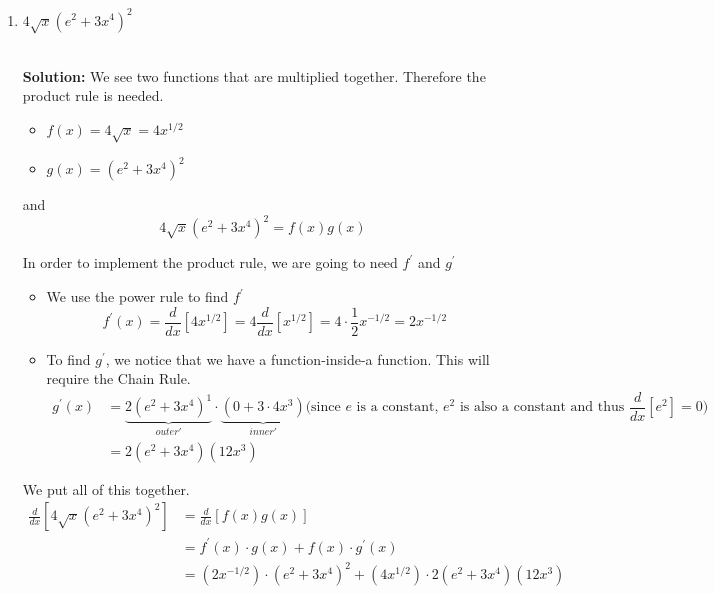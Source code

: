 \documentclass[11pt]{article}
\newcommand{\col}[1]{{\color{blue}#1}} %
\newcommand{\solbf}[1]{~\\ \col{ {\textbf{Solution: }}#1} }
\newcommand{\al}[1]{\begin{align*} #1 \end{align*}}
\newcommand{\itemI}[1]{\begin{itemize} #1 \end{itemize}}
\def\ds{\displaystyle}
\begin{document}
\begin{enumerate}
\begin{enumerate}
{$f(x)=\dfrac{\ln(x)+x^2}{x^3-2x}$.
We see two functions that are divided. Therefore the quotient rule is needed.
\itemI{
\item  $\ds hi(x)=\ln(x)+x^2 \Rightarrow  hi^{\prime}(x)=\frac{1}{x}+2x$ 
\item  $lo(x)=x^3-2x \Rightarrow lo^{\prime}(x)=3x^2-2$
}

\al{
\frac{d}{dx}\left[ \dfrac{\ln(x)+x^2}{x^3-2x} \right]&=\frac{hi^{\prime}(x)\cdot lo(x)-hi(x)\cdot lo^{\prime}(x)}{lo^2(x)}\\
&=\frac{\left(\dfrac{1}{x}+2x \right)\left(x^3-2x \right)-\left(\ln(x)+x^2 \right) \left(3x^2-2 \right)}{\left(x^3-2x \right)^2}
}
}

\item $4\sqrt{x}\left(e^2+3x^4\right)^2$\\
\solbf{We see two functions that are multiplied together. Therefore the product rule is needed.
\itemI{
\item $f(x)=4\sqrt{x}=4x^{1/2}$
\item $g(x)=(e^2+3x^4)^2$
}
and $$4\sqrt{x}\left(e^2+3x^4\right)^2=f(x)g(x)$$

In order to implement the product rule, we are going to need $f^{\prime}$ and $g^{\prime}$
\itemI{
\item We use the power rule to find $f^{\prime}$
$$\ds f^{\prime}(x)=\frac{d}{dx}\left[4x^{1/2}\right]=4\frac{d}{dx}\left[x^{1/2}\right]=4\cdot \frac{1}{2}x^{-1/2} =2x^{-1/2} $$
\item To find $g^{\prime}$, we notice that we have a function-inside-a function. This will require the Chain Rule.
\al{
g^{\prime}(x)&=\underbrace{2\left( e^2+3x^4\right)^1}_{outer'}\cdot \underbrace{\left( 0+3\cdot 4x^3 \right)}_{inner'} \text{(since $e$ is a constant, $e^2$ is also a constant and thus $\dfrac{d}{dx}[e^2]=0$)}\\
&=2(e^2+3x^4)(12x^3)
}
}
We put all of this together.
\al{
\frac{d}{dx}\left[4\sqrt{x}\left(e^2+3x^4\right)^2\right]& =\frac{d}{dx}\left[ f(x)g(x)\right]\\
&=f^{\prime}(x)\cdot g(x)+f(x)\cdot g^{\prime}(x)\\
&=\left( 2x^{-1/2}\right)\cdot (e^2+3x^4)^2+\left(4x^{1/2}\right) \cdot 2(e^2+3x^4)(12x^3)
}
}

\end{enumerate}





\end{enumerate}
\end{document}
